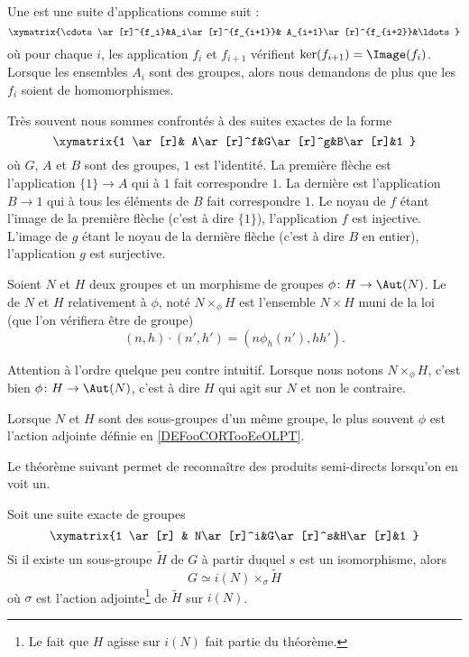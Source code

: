 Une  est une suite d'applications comme suit :
\begin{equation}
    \xymatrix{%
    \cdots \ar[r]^{f_i}&A_i\ar[r]^{f_{i+1}}& A_{i+1}\ar[r]^{f_{i+2}}&\ldots
       }
\end{equation}
où pour chaque \( i\), les application \( f_i\) et \( f_{i+1}\) vérifient \( \ker(f_{i+1})=\Image(f_i)\). Lorsque les ensembles \( A_i\) sont des groupes, alors nous demandons de plus que les \( f_i\) soient de homomorphismes.

Très souvent nous sommes confrontés à des suites exactes de la forme
\begin{equation}
    \xymatrix{%
    1 \ar[r]& A\ar[r]^f&G\ar[r]^g&B\ar[r]&1
       }
\end{equation}
où \( G\), \( A\) et \( B\) sont des groupes, \( 1\) est l'identité. La première flèche est l'application \( \{ 1 \}\to A\) qui à \( 1\) fait correspondre \( 1\). La dernière est l'application \( B\to 1\) qui à tous les éléments de \( B\) fait correspondre \( 1\). Le noyau de \( f\) étant l'image de la première flèche (c'est à dire \( \{ 1 \}\)), l'application \( f\) est injective. L'image de \( g\) étant le noyau de la dernière flèche (c'est à dire \( B\) en entier), l'application \( g\) est surjective.

\begin{definition}     \label{DEFooKWEHooISNQzi}
    Soient \( N\) et \( H\) deux groupes et un morphisme de groupes \( \phi\colon H\to \Aut(N)\). Le  de \( N\) et \( H\) relativement à \( \phi\), noté \( N\times_{\phi}H\) est l'ensemble \( N\times H\) muni de la loi (que l'on vérifiera être de groupe)
    \begin{equation}\label{EqDRgbBI}
        (n,h)\cdot (n',h')=(n\phi_h(n'),hh').
    \end{equation}
\end{definition}
Attention à l'ordre quelque peu contre intuitif. Lorsque nous notons \( N\times_{\phi}H\), c'est bien \( \phi\colon H\to \Aut(N)\), c'est à dire \( H\) qui agit sur \( N\) et non le contraire.

Lorsque \( N\) et \( H\) sont des sous-groupes d'un même groupe, le plus souvent \( \phi\) est l'action adjointe définie en \ref{DEFooCORTooEeOLPT}.

Le théorème suivant permet de reconnaître des produits semi-directs lorsqu'on en voit un.
\begin{theorem}
    Soit une suite exacte de groupes
    \begin{equation}
    \xymatrix{%
    1 \ar[r]        & N\ar[r]^i&G\ar[r]^s&H\ar[r]&1
       }
    \end{equation}
    Si il existe un sous-groupe \( \tilde H\) de \( G\) à partir duquel \( s\) est un isomorphisme, alors
    \begin{equation}
        G\simeq i(N)\times_{\sigma}\tilde H
    \end{equation}
    où \( \sigma\) est l'action adjointe\footnote{Le fait que \( H\) agisse sur \( i(N)\) fait partie du théorème.} de \( \tilde H\) sur \( i(N)\).
\end{theorem}

